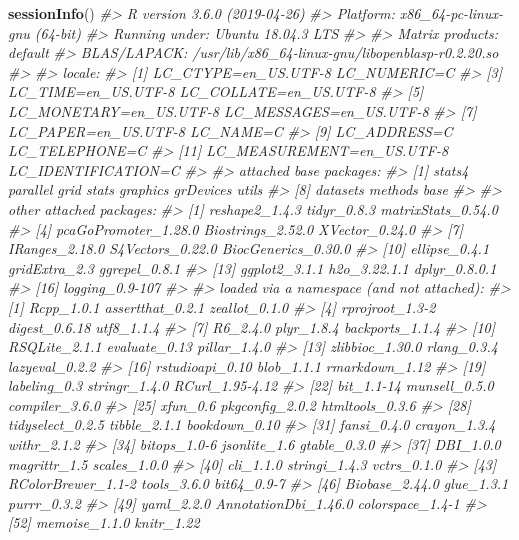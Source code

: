 \documentclass[]{book}
\newenvironment{Shaded}{\begin{snugshade}}{\end{snugshade}}
\newcommand{\CommentTok}[1]{\textcolor[rgb]{0.56,0.35,0.01}{\textit{#1}}}
\newcommand{\KeywordTok}[1]{\textcolor[rgb]{0.13,0.29,0.53}{\textbf{#1}}}
\newcommand{\NormalTok}[1]{#1}
\begin{document}
\begin{Shaded}
\begin{Highlighting}[]
\KeywordTok{sessionInfo}\NormalTok{()}
\CommentTok{#> R version 3.6.0 (2019-04-26)}
\CommentTok{#> Platform: x86_64-pc-linux-gnu (64-bit)}
\CommentTok{#> Running under: Ubuntu 18.04.3 LTS}
\CommentTok{#> }
\CommentTok{#> Matrix products: default}
\CommentTok{#> BLAS/LAPACK: /usr/lib/x86_64-linux-gnu/libopenblasp-r0.2.20.so}
\CommentTok{#> }
\CommentTok{#> locale:}
\CommentTok{#>  [1] LC_CTYPE=en_US.UTF-8       LC_NUMERIC=C              }
\CommentTok{#>  [3] LC_TIME=en_US.UTF-8        LC_COLLATE=en_US.UTF-8    }
\CommentTok{#>  [5] LC_MONETARY=en_US.UTF-8    LC_MESSAGES=en_US.UTF-8   }
\CommentTok{#>  [7] LC_PAPER=en_US.UTF-8       LC_NAME=C                 }
\CommentTok{#>  [9] LC_ADDRESS=C               LC_TELEPHONE=C            }
\CommentTok{#> [11] LC_MEASUREMENT=en_US.UTF-8 LC_IDENTIFICATION=C       }
\CommentTok{#> }
\CommentTok{#> attached base packages:}
\CommentTok{#>  [1] stats4    parallel  grid      stats     graphics  grDevices utils    }
\CommentTok{#>  [8] datasets  methods   base     }
\CommentTok{#> }
\CommentTok{#> other attached packages:}
\CommentTok{#>  [1] reshape2_1.4.3       tidyr_0.8.3          matrixStats_0.54.0  }
\CommentTok{#>  [4] pcaGoPromoter_1.28.0 Biostrings_2.52.0    XVector_0.24.0      }
\CommentTok{#>  [7] IRanges_2.18.0       S4Vectors_0.22.0     BiocGenerics_0.30.0 }
\CommentTok{#> [10] ellipse_0.4.1        gridExtra_2.3        ggrepel_0.8.1       }
\CommentTok{#> [13] ggplot2_3.1.1        h2o_3.22.1.1         dplyr_0.8.0.1       }
\CommentTok{#> [16] logging_0.9-107     }
\CommentTok{#> }
\CommentTok{#> loaded via a namespace (and not attached):}
\CommentTok{#>  [1] Rcpp_1.0.1           assertthat_0.2.1     zeallot_0.1.0       }
\CommentTok{#>  [4] rprojroot_1.3-2      digest_0.6.18        utf8_1.1.4          }
\CommentTok{#>  [7] R6_2.4.0             plyr_1.8.4           backports_1.1.4     }
\CommentTok{#> [10] RSQLite_2.1.1        evaluate_0.13        pillar_1.4.0        }
\CommentTok{#> [13] zlibbioc_1.30.0      rlang_0.3.4          lazyeval_0.2.2      }
\CommentTok{#> [16] rstudioapi_0.10      blob_1.1.1           rmarkdown_1.12      }
\CommentTok{#> [19] labeling_0.3         stringr_1.4.0        RCurl_1.95-4.12     }
\CommentTok{#> [22] bit_1.1-14           munsell_0.5.0        compiler_3.6.0      }
\CommentTok{#> [25] xfun_0.6             pkgconfig_2.0.2      htmltools_0.3.6     }
\CommentTok{#> [28] tidyselect_0.2.5     tibble_2.1.1         bookdown_0.10       }
\CommentTok{#> [31] fansi_0.4.0          crayon_1.3.4         withr_2.1.2         }
\CommentTok{#> [34] bitops_1.0-6         jsonlite_1.6         gtable_0.3.0        }
\CommentTok{#> [37] DBI_1.0.0            magrittr_1.5         scales_1.0.0        }
\CommentTok{#> [40] cli_1.1.0            stringi_1.4.3        vctrs_0.1.0         }
\CommentTok{#> [43] RColorBrewer_1.1-2   tools_3.6.0          bit64_0.9-7         }
\CommentTok{#> [46] Biobase_2.44.0       glue_1.3.1           purrr_0.3.2         }
\CommentTok{#> [49] yaml_2.2.0           AnnotationDbi_1.46.0 colorspace_1.4-1    }
\CommentTok{#> [52] memoise_1.1.0        knitr_1.22}
\end{Highlighting}
\end{Shaded}
\end{document}
